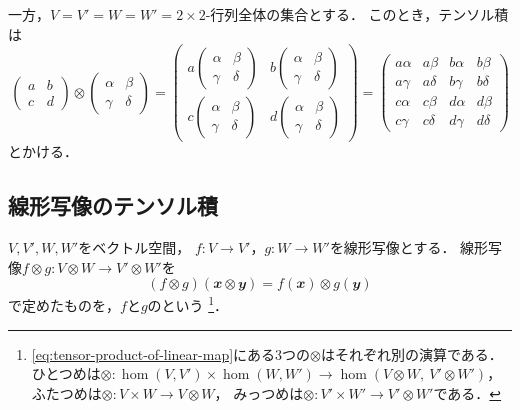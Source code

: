 \documentclass[../sotsu.tex]{subfiles}
\begin{document}
一方，\( V = V' = W = W' = \text{$2 \times 2$-行列全体の集合} \)とする．
このとき，テンソル積は
\begin{equation*}
    \begin{pmatrix}
        a  & b  \\ c  & d 
    \end{pmatrix}
    \otimes 
    \begin{pmatrix}
        \alpha & \beta \\ \gamma & \delta
    \end{pmatrix}
    =
    \begin{pmatrix}
        a
        \begin{pmatrix}
            \alpha & \beta \\ \gamma & \delta
        \end{pmatrix}
        &
        b
        \begin{pmatrix}
            \alpha & \beta \\ \gamma & \delta
        \end{pmatrix}
        \\
        c
        \begin{pmatrix}
            \alpha & \beta \\ \gamma & \delta
        \end{pmatrix}
        &
        d
        \begin{pmatrix}
            \alpha & \beta \\ \gamma & \delta
        \end{pmatrix}
    \end{pmatrix}
    =
    \begin{pmatrix}
        a \alpha  &  a \beta   &  b \alpha  &  b \beta   \\
        a \gamma  &  a \delta  &  b \gamma  &  b \delta  \\
        c \alpha  &  c \beta   &  d \alpha  &  d \beta   \\
        c \gamma  &  c \delta  &  d \gamma  &  d \delta  
    \end{pmatrix}
\end{equation*}
とかける．



\subsection{線形写像のテンソル積}
\label{sec:tensor-product-of-linear-map}

$V, V', W, W'$をベクトル空間，
$f \colon V \to V'$，$g \colon W \to W'$を線形写像とする．
線形写像$f \otimes g \colon V \otimes W \to V' \otimes W'$を
\begin{equation}
    \label{eq:tensor-product-of-linear-map}
    (f \otimes g)(𝒙 \otimes 𝒚)
        = f(𝒙) \otimes g(𝒚)
\end{equation}
で定めたものを，$f$と$g$のという%
\footnote{
    \cref{eq:tensor-product-of-linear-map}にある3つの$\otimes$はそれぞれ別の演算である．
    ひとつめは$\otimes \colon \hom(V, V') \times \hom(W, W') \to \hom ( V \otimes W, \  V' \otimes W' )$，
    ふたつめは$\otimes \colon V \times W \to V \otimes W$，
    みっつめは$\otimes \colon V' \times W' \to V' \otimes W'$である．
}．
\end{document}
